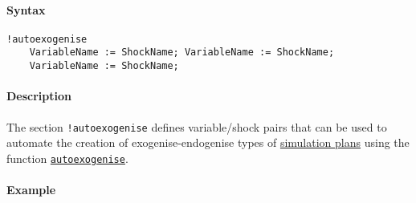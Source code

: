 


	\paragraph{Syntax}

\begin{verbatim}
!autoexogenise
    VariableName := ShockName; VariableName := ShockName;
    VariableName := ShockName;
\end{verbatim}

\paragraph{Description}

The section \texttt{!autoexogenise} defines variable/shock pairs that
can be used to automate the creation of exogenise-endogenise types of
\href{plan/Contents}{simulation plans} using the function
\href{plan/autoexogenise}{\texttt{autoexogenise}}.

\paragraph{Example}


